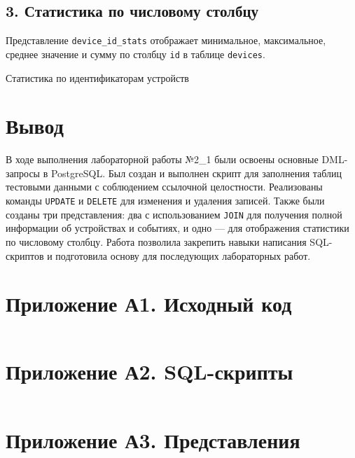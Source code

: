 \documentclass[oneside,a4paper,14pt]{extarticle}
\begin{document}
\subsection*{3. Статистика по числовому столбцу}

Представление \texttt{device\_id\_stats} отображает минимальное, максимальное, среднее значение и сумму по столбцу \texttt{id} в таблице \texttt{devices}.

\begin{table}[H]
  \centering
  \caption{Статистика по идентификаторам устройств}
  \label{tab:device_id_stats}
\end{table}

\section*{Вывод}

В ходе выполнения лабораторной работы №2\_1 были освоены основные DML-запросы в PostgreSQL. Был создан и выполнен скрипт для заполнения таблиц тестовыми данными с соблюдением ссылочной целостности. Реализованы команды \texttt{UPDATE} и \texttt{DELETE} для изменения и удаления записей. Также были созданы три представления: два с использованием \texttt{JOIN} для получения полной информации об устройствах и событиях, и одно — для отображения статистики по числовому столбцу. Работа позволила закрепить навыки написания SQL-скриптов и подготовила основу для последующих лабораторных работ.

\newpage

\section*{Приложение А1. Исходный код}
\inputminted{Dockerfile}{../Containerfile}

\section*{Приложение А2. SQL-скрипты}
\inputminted{sql}{code/init_data.sql}

\section*{Приложение А3. Представления}
\inputminted{sql}{code/views.sql}
\end{document}
